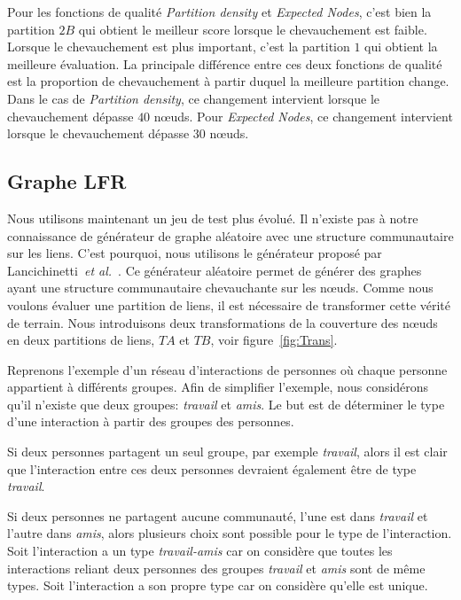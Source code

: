 Pour les fonctions de qualité \emph{Partition density} et \emph{Expected Nodes}, c'est bien la partition $2B$ qui obtient le meilleur score lorsque le chevauchement est faible.
Lorsque le chevauchement est plus important, c'est la partition $1$ qui obtient la meilleure évaluation.
La principale différence entre ces deux fonctions de qualité est la proportion de chevauchement à partir duquel la meilleure partition change.
Dans le cas de \emph{Partition density}, ce changement intervient lorsque le chevauchement dépasse $40$ n\oe{}uds.
Pour \emph{Expected Nodes}, ce changement intervient lorsque le chevauchement dépasse $30$ n\oe{}uds.

\subsection{Graphe LFR}
Nous utilisons maintenant un jeu de test plus évolué.
Il n'existe pas à notre connaissance de générateur de graphe aléatoire avec une structure communautaire sur les liens.
C'est pourquoi, nous utilisons le générateur proposé par Lancichinetti~\textit{et al.}~\cite{Lancichinetti2009b}.
Ce générateur aléatoire permet de générer des graphes ayant une structure communautaire chevauchante sur les n\oe{}uds.
Comme nous voulons évaluer une partition de liens, il est nécessaire de transformer cette vérité de terrain.
Nous introduisons deux transformations de la couverture des n\oe{}uds en deux partitions de liens, $TA$ et $TB$, voir figure~\ref{fig:Trans}.


Reprenons l'exemple d'un réseau d'interactions de personnes où chaque personne appartient à différents groupes.
Afin de simplifier l'exemple, nous considérons qu'il n'existe que deux groupes: \emph{travail} et \emph{amis}.
Le but est de déterminer le type d'une interaction à partir des groupes des personnes.

Si deux personnes partagent un seul groupe, par exemple \emph{travail}, alors il est clair que l'interaction entre ces deux personnes devraient également être de type \emph{travail}.

Si deux personnes ne partagent aucune communauté, l'une est dans \emph{travail} et l'autre dans \emph{amis}, alors plusieurs choix sont possible pour le type de l'interaction.
Soit l'interaction a un type \emph{travail-amis} car on considère que toutes les interactions reliant deux personnes des groupes \emph{travail} et \emph{amis} sont de même types.
Soit l'interaction a son propre type car on considère qu'elle est unique.

